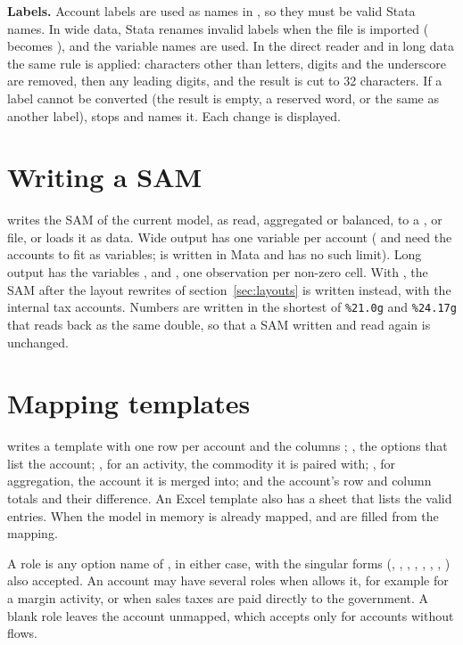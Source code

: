 \textbf{Labels.} Account labels are used as names in , so they
must be valid Stata names. In wide data, Stata renames invalid labels when the
file is imported ( becomes ), and the variable names are
used. In the direct reader and in long data the same rule is applied:
characters other than letters, digits and the underscore are removed, then any
leading digits, and the result is cut to 32 characters. If a label cannot be
converted (the result is empty, a reserved word, or the same as another
label),  stops and names it. Each change is displayed.

\section{Writing a SAM}\label{sec:writing}

 writes the SAM of the current model, as read, aggregated
or balanced, to a ,  or  file, or loads it as
data. Wide output has one variable per account ( and 
need the accounts to fit as variables;  is written in Mata and has no
such limit). Long output has the variables ,  and
, one observation per non-zero cell. With , the SAM after
the layout rewrites of section~\ref{sec:layouts} is written instead, with the
internal tax accounts. Numbers are written in the shortest of \texttt{\%21.0g}
and \texttt{\%24.17g} that reads back as the same double, so that a SAM written
and read again is unchanged.

\section{Mapping templates}\label{sec:template}

 writes a template with one row per account and the
columns ; , the  options that list the
account; , for an activity, the commodity it is paired with;
, for aggregation, the account it is merged into; and the account's
row and column totals and their difference. An Excel template also has a sheet
 that lists the valid entries. When the model in memory is already
mapped,  and  are filled from the mapping.

A role is any option name of , in either case, with the singular
forms (, , , ,
, , , ) also
accepted. An account may have several roles when  allows it, for
example  for a margin activity, or
 when sales taxes are paid directly to the government.
A blank role leaves the account unmapped, which  accepts only for
accounts without flows.

